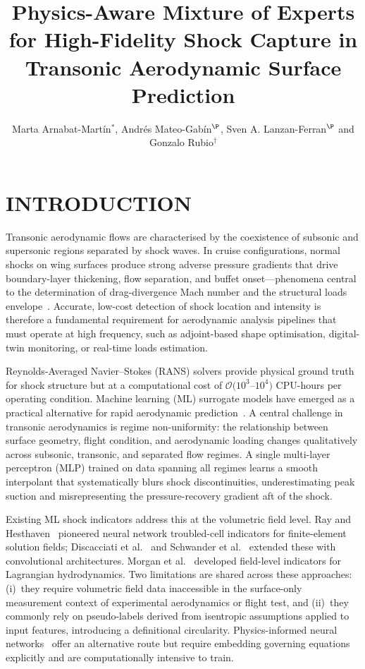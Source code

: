 \documentclass{WCCM-ECCOMAS_2026_Full_Paper}
\title{Physics-Aware Mixture of Experts for High-Fidelity Shock Capture in Transonic Aerodynamic Surface Prediction}
\author{Marta Arnabat-Martín$^{*}$, Andrés Mateo-Gabín$^{\P}$, Sven A. Lanzan-Ferran$^{\P}$ and Gonzalo Rubio$^{\dag}$}
\begin{document}
\maketitle

\section{INTRODUCTION}

Transonic aerodynamic flows are characterised by the coexistence of
subsonic and supersonic regions separated by shock waves.  In cruise
configurations, normal shocks on wing surfaces produce strong adverse
pressure gradients that drive boundary-layer thickening, flow
separation, and buffet onset---phenomena central to the determination
of drag-divergence Mach number and the structural loads
envelope~\cite{Vassberg2008,Levy2013}.  Accurate, low-cost detection
of shock location and intensity is therefore a fundamental requirement
for aerodynamic analysis pipelines that must operate at high
frequency, such as adjoint-based shape optimisation, digital-twin
monitoring, or real-time loads estimation.

Reynolds-Averaged Navier--Stokes (RANS) solvers provide physical
ground truth for shock structure but at a computational cost of
$\mathcal{O}(10^{3}$--$10^{4})$ CPU-hours per operating condition.
Machine learning (ML) surrogate models have emerged as a practical
alternative for rapid aerodynamic
prediction~\cite{Han2018,Bhatnagar2019,Sekar2019}.  A central
challenge in transonic aerodynamics is regime non-uniformity: the
relationship between surface geometry, flight condition, and
aerodynamic loading changes qualitatively across subsonic, transonic,
and separated flow regimes.  A single multi-layer perceptron (MLP)
trained on data spanning all regimes learns a smooth interpolant that
systematically blurs shock discontinuities, underestimating peak
suction and misrepresenting the pressure-recovery gradient aft of the
shock.

Existing ML shock indicators address this at the volumetric field
level.  Ray and Hesthaven~\cite{Ray2018,Ray2019} pioneered neural
network troubled-cell indicators for finite-element solution fields;
Discacciati et al.~\cite{Discacciati2020} and Schwander et
al.~\cite{Schwander2021} extended these with convolutional
architectures.  Morgan et al.~\cite{Morgan2020} developed
field-level indicators for Lagrangian hydrodynamics.  Two limitations
are shared across these approaches: (i)~they require volumetric field
data inaccessible in the surface-only measurement context of
experimental aerodynamics or flight test, and (ii)~they commonly rely
on pseudo-labels derived from isentropic assumptions applied to input
features, introducing a definitional circularity.  Physics-informed
neural networks~\cite{Raissi2019,Karniadakis2021} offer an
alternative route but require embedding governing equations explicitly
and are computationally intensive to train.
\end{document}
